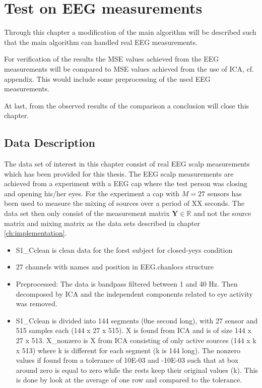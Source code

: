 \chapter{Test on EEG measurements}
Through this chapter a modification of the main algorithm will be described such that the main algorithm can handled real EEG measurements. 

For verification of the results the MSE values achieved from the EEG measurements will be compared to MSE values achieved from the use of ICA, cf. appendix. This would include some preprocessing of the used EEG measurements.

At last, from the observed results of the comparison a conclusion will close this chapter.

\section{Data Description}
The data set of interest in this chapter consist of real EEG scalp measurements which has been provided for this thesis. The EEG scalp measurements are achieved from a experiment with a EEG cap where the test person was closing and opening his/her eyes. For the experiment a cap with $M = 27$ sensors has been used to measure the mixing of sources over a period of XX seconds. The data set then only consist of the measurement matrix $\mathbf{Y} \in \mathbb{R}$ and not the source matrix and mixing matrix as the data sets described in chapter \ref{ch:implementation}.



\begin{itemize}
\item S1\_Cclean is clean data for the forst subject for closed-yeys condition
\item 27 channels with names and position in EEG.chanlocs structure 
\item Preprocessed: The data is bandpass filtered between 1 and 40 Hz. Then decomposed by ICA and the independent components related to eye activity was removed.
\item S1\_Cclean is divided into 144 segments (0ne second long), with 27 sensor and 515 samples each (144 x 27 x 515).  X is found from ICA and is of size 144 x 27 x 513. X\_nonzero is X from ICA consisting of only active sources (144 x k x 513) where k is different for each segment (k is 144 long). The nonzero values if found from a tolerance of 10E-03 and -10E-03 such that at box around zero is equal to zero while the rests keep their original values (k). This is done by look at the average of one row and compared to the tolerance.
\end{itemize}
